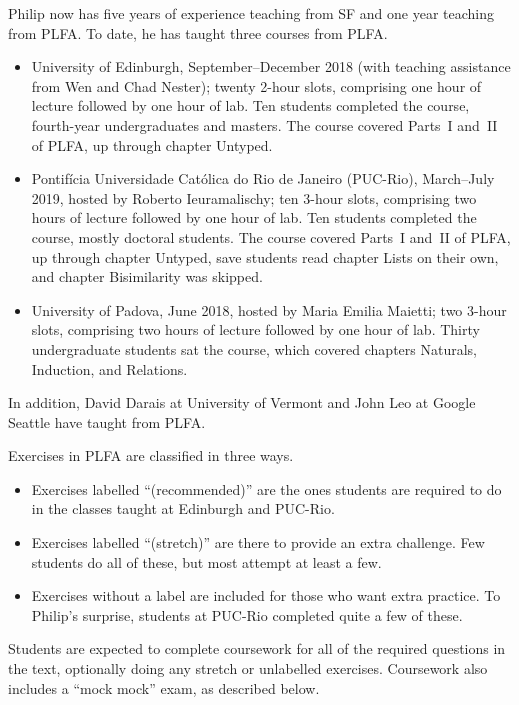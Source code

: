 \documentclass[preprint,authoryear]{elsarticle}
\begin{document}
Philip now has five years of experience teaching from SF and one year
teaching from PLFA.  To date, he has taught three courses from PLFA.
\begin{itemize}
\item
  University of Edinburgh, September--December 2018 (with teaching
  assistance from Wen and Chad Nester); twenty 2-hour slots,
  comprising one hour of lecture followed by one hour of lab. Ten
  students completed the course, fourth-year undergraduates and
  masters.  The course covered Parts~I and~II of PLFA, up through
  chapter Untyped.

\item
  Pontifícia Universidade Católica do Rio de Janeiro (PUC-Rio),
  March--July 2019, hosted by Roberto Ieuramalischy; ten 3-hour
  slots, comprising two hours of lecture followed by one hour of lab.
  Ten students completed the course, mostly doctoral students.  The
  course covered Parts~I and~II of PLFA, up through chapter Untyped,
  save students read chapter
  Lists on their own, and chapter Bisimilarity was skipped.

\item
  University of Padova, June 2018, hosted by Maria Emilia Maietti; two
  3-hour slots, comprising two hours of lecture followed by one
  hour of lab.  Thirty undergraduate students sat the course, which
  covered chapters Naturals, Induction, and Relations.
    
\end{itemize}
In addition, David Darais at University of Vermont and John Leo at
Google Seattle have taught from PLFA.

Exercises in PLFA are classified in three ways.
\begin{itemize}
\item
  Exercises labelled “(recommended)” are the ones students are
  required to do in the classes taught at Edinburgh and PUC-Rio.

\item
  Exercises labelled “(stretch)” are there to provide an extra
  challenge. Few students do all of these, but most attempt at least a
  few. 

\item   
  Exercises without a label are included for those who want extra
  practice.  To Philip's surprise, students at PUC-Rio completed
  quite a few of these.
\end{itemize}
Students are expected to complete coursework for all of the
required questions in the text, optionally doing any stretch or
unlabelled exercises. Coursework also includes a ``mock mock''
exam, as described below.
\end{document}
